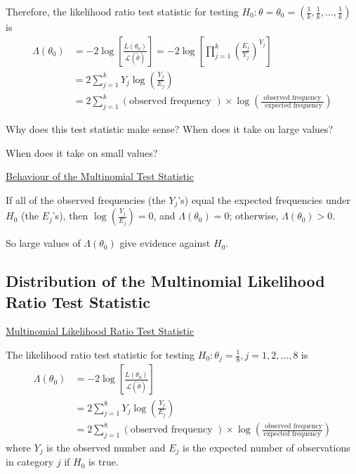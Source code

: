 Therefore, the likelihood ratio test statistic for testing $H_{0}: \theta=\theta_{0}=\left(\frac{1}{k}, \frac{1}{k}, \ldots, \frac{1}{k}\right)$ is
\[
    \begin{aligned}
        \Lambda\left(\theta_{0}\right) & =-2 \log \left[\frac{L\left(\theta_{0}\right)}{\mathcal{L}(\tilde{\theta})}\right]=-2 \log \left[\prod_{j=1}^{k}\left(\frac{E_{j}}{Y_{j}}\right)^{Y_{j}}\right] \\
                                       & =2 \sum_{j=1}^{k} Y_{j} \log \left(\frac{Y_{j}}{E_{j}}\right)                                                                                         \\
                                       & =2 \sum_{j=1}^{k}(\text{observed frequency }) \times \log \left(\frac{\text{ observed frequency }}{\text{ expected frequency}}\right)
    \end{aligned}
\]

Why does this test statistic make sense? When does it take on large values?

When does it take on small values?

\underline{Behaviour of the Multinomial Test Statistic}

If all of the observed frequencies (the $Y_{j}$'s) equal the expected frequencies
under $H_{0}$ (the $E_{j}$'s), then $\log \left(\frac{Y_{j}}{E_{j}}\right)=0$,
and $\Lambda\left(\theta_{0}\right)=0 $; otherwise, $ \Lambda\left(\theta_{0}\right)>0$.

So large values of $\Lambda\left(\theta_{0}\right)$ give evidence against $H_{0}$.

\subsection{Distribution of the Multinomial Likelihood Ratio Test Statistic}
\underline{Multinomial Likelihood Ratio Test Statistic}

The likelihood ratio test statistic for testing $H_{0}: \theta_{j}=\frac{1}{8}, j=1,2, \ldots, 8$ is
\[
    \begin{aligned}
        \Lambda\left(\theta_{0}\right) & =-2 \log \left[\frac{L\left(\theta_{0}\right)}{\mathcal{L}(\tilde{\theta})}\right]                          \\
                                       & =2 \sum_{j=1}^{8} Y_{j} \log \left(\frac{Y_{j}}{E_{j}}\right)                                     \\
                                       & =2 \sum_{j=1}^{8}(\text{observed frequency }) \times \log \left(\frac{\text{ observed frequency}}
        {\text{expected frequency}}\right)
    \end{aligned}
\]
where $Y_{j}$ is the observed number and $E_{j}$ is the expected number of observations
in category $j$ if $H_{0}$ is true.

